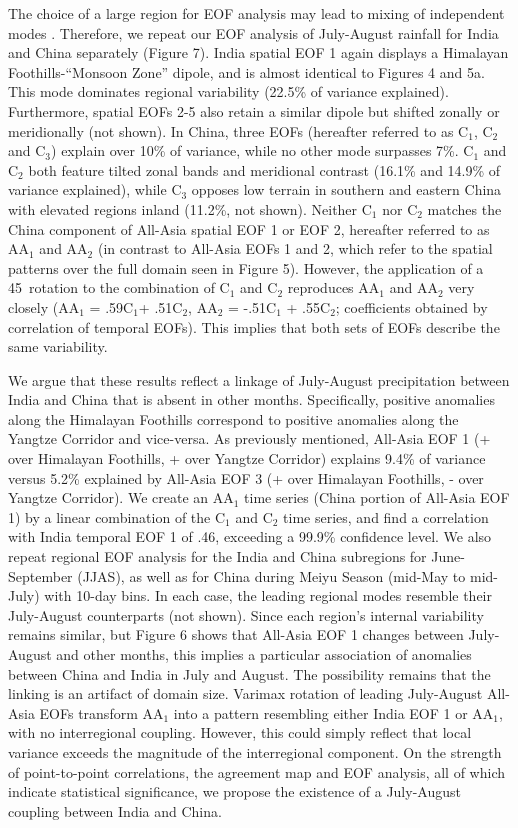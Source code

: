 \documentclass[12pt]{article}
\begin{document}
	The choice of a large region for EOF analysis may lead to mixing of independent modes \citep{Dai1997,Wilks2006}. Therefore, we repeat our EOF analysis of July-August rainfall for India and China separately (Figure 7). India spatial EOF 1 again displays a Himalayan Foothills-``Monsoon Zone'' dipole, and is almost identical to Figures 4 and 5a. This mode dominates regional variability (22.5\% of variance explained). Furthermore, spatial EOFs 2-5 also retain a similar dipole but shifted zonally or meridionally (not shown). In China, three EOFs (hereafter referred to as C$_1$, C$_2$ and C$_3$) explain over 10\% of variance, while no other mode surpasses 7\%. C$_1$ and C$_2$ both feature tilted zonal bands and meridional contrast (16.1\% and 14.9\% of variance explained), while C$_3$ opposes low terrain in southern and eastern China with elevated regions inland (11.2\%, not shown). Neither C$_1$ nor C$_2$ matches the China component of All-Asia spatial EOF 1 or EOF 2, hereafter referred to as AA$_1$ and AA$_2$ (in contrast to All-Asia EOFs 1 and 2, which refer to the spatial patterns over the full domain seen in Figure 5). However, the application of a 45\textdegree\ rotation to the combination of  C$_1$ and C$_2$ reproduces AA$_1$ and AA$_2$ very closely (AA$_1$ = .59C$_1$+ .51C$_2$, AA$_2$ = -.51C$_1$ + .55C$_2$; coefficients obtained by correlation of temporal EOFs). This implies that both sets of EOFs describe the same variability.  
	
	We argue that these results reflect a linkage of July-August precipitation between India and China that is absent in other months. Specifically, positive anomalies along the Himalayan Foothills correspond to positive anomalies along the Yangtze Corridor and vice-versa.  As previously mentioned, All-Asia EOF 1 (+ over Himalayan Foothills, + over Yangtze Corridor) explains 9.4\% of variance versus 5.2\% explained by All-Asia EOF 3 (+ over Himalayan Foothills, - over Yangtze Corridor). We create an AA$_1$ time series (China portion of All-Asia EOF 1) by a linear combination of the C$_1$ and C$_2$ time series, and find a correlation with India temporal EOF 1 of .46, exceeding a 99.9\% confidence level. We also repeat regional EOF analysis for the India and China subregions for June-September (JJAS), as well as for China during Meiyu Season (mid-May to mid-July) with 10-day bins. In each case, the leading regional modes resemble their July-August counterparts (not shown). Since each region's internal variability remains similar, but Figure 6 shows that All-Asia EOF 1 changes between July-August and other months, this implies a particular association of anomalies between China and India in July and August. The possibility remains that the linking is an artifact of domain size. Varimax rotation of leading July-August All-Asia EOFs transform AA$_1$ into a pattern resembling either India EOF 1 or AA$_1$, with no interregional coupling. However, this could simply reflect that local variance exceeds the magnitude of the interregional component. On the strength of point-to-point correlations, the agreement map and EOF analysis, all of which indicate statistical significance, we propose the existence of a July-August coupling between India and China.
\end{document}
